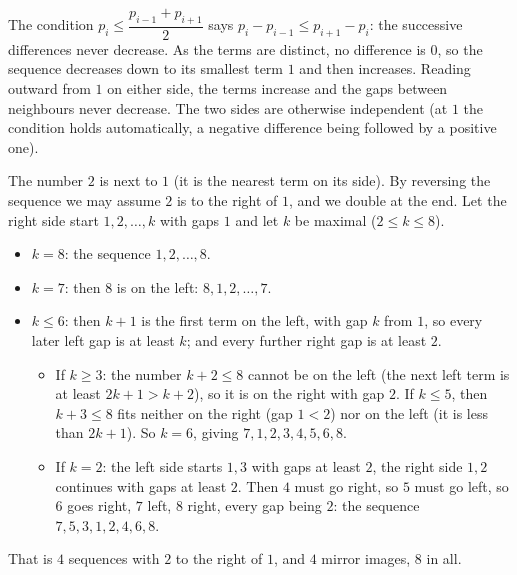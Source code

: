 The condition $p_i\le\dfrac{p_{i-1}+p_{i+1}}{2}$ says $p_i-p_{i-1}\le p_{i+1}-p_i$: the successive differences never decrease. As the terms are distinct, no difference is $0$, so the sequence decreases down to its smallest term $1$ and then increases. Reading outward from $1$ on either side, the terms increase and the gaps between neighbours never decrease. The two sides are otherwise independent (at $1$ the condition holds automatically, a negative difference being followed by a positive one).

The number $2$ is next to $1$ (it is the nearest term on its side). By reversing the sequence we may assume $2$ is to the right of $1$, and we double at the end. Let the right side start $1,2,\dots,k$ with gaps $1$ and let $k$ be maximal ($2\le k\le8$).
\begin{itemize}
\item $k=8$: the sequence $1,2,\dots,8$.
\item $k=7$: then $8$ is on the left: $8,1,2,\dots,7$.
\item $k\le6$: then $k+1$ is the first term on the left, with gap $k$ from $1$, so every later left gap is at least $k$; and every further right gap is at least $2$.
 \begin{itemize}
 \item If $k\ge3$: the number $k+2\le8$ cannot be on the left (the next left term is at least $2k+1>k+2$), so it is on the right with gap $2$. If $k\le5$, then $k+3\le8$ fits neither on the right (gap $1<2$) nor on the left (it is less than $2k+1$). So $k=6$, giving $7,1,2,3,4,5,6,8$.
 \item If $k=2$: the left side starts $1,3$ with gaps at least $2$, the right side $1,2$ continues with gaps at least $2$. Then $4$ must go right, so $5$ must go left, so $6$ goes right, $7$ left, $8$ right, every gap being $2$: the sequence $7,5,3,1,2,4,6,8$.
 \end{itemize}
\end{itemize}
That is $4$ sequences with $2$ to the right of $1$, and $4$ mirror images, $\boxed{8}$ in all.
